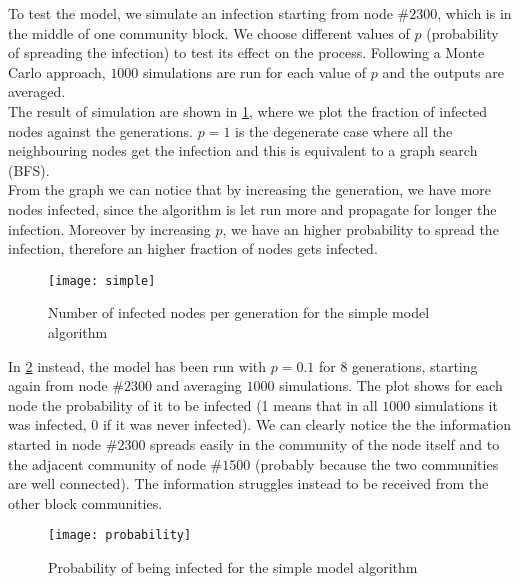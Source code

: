 To test the model, we simulate an infection starting from node $\#2300$, which is in the middle of one community block.
We choose different values of $p$ (probability of spreading the infection) to test its effect on the process. Following a Monte Carlo approach, $1000$ simulations are run for each value of $p$ and the outputs are averaged. \\
The result of simulation are shown in \cref{fig:2_simple}, where we plot the fraction of infected nodes against the generations. $p=1$ is the degenerate case where all the neighbouring nodes get the infection and this is equivalent to a graph search (BFS).\\
From the graph we can notice that by increasing the generation, we have more nodes infected, since the algorithm is let run more and propagate for longer the infection. Moreover by increasing $p$, we have an higher probability to spread the infection, therefore an higher fraction of nodes gets infected.

\begin{figure} [!ht]
	\centering
	\texttt{[image: simple]}
	\caption{Number of infected nodes per generation for the simple model algorithm}
	\label{fig:2_simple}
\end{figure}

In \cref{fig:2_probability} instead, the model has been run with $p=0.1$ for 8 generations, starting again from node $\#2300$ and averaging $1000$ simulations. The plot shows for each node the probability of it to be infected (1 means that in all $1000$ simulations it was infected, 0 if it was never infected). We can clearly notice the the information started in node $\#2300$ spreads easily in the community of the node itself and to the adjacent community of node $\#1500$ (probably because the two communities are well connected). The information struggles instead to be received from the other block communities.

\begin{figure} [!ht]
	\centering
	\texttt{[image: probability]}
	\caption{Probability of being infected for the simple model algorithm}
	\label{fig:2_probability}
\end{figure}


